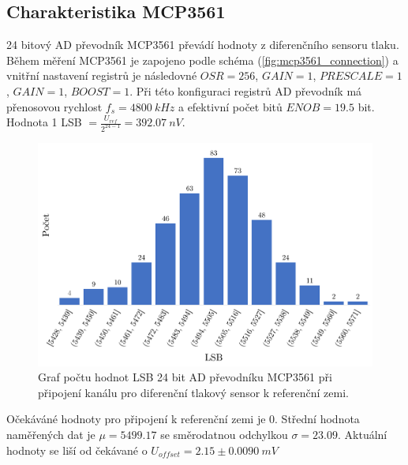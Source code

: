 \subsection{Charakteristika MCP3561} \label{section:char_mcp}
24 bitový AD převodník MCP3561 převádí hodnoty z diferenčního sensoru tlaku. Během měření MCP3561 je zapojeno podle schéma (\ref{fig:mcp3561_connection}) a vnitřní nastavení registrů je následovné $OSR = 256$, $GAIN = 1$, $PRESCALE = 1$, $GAIN = 1$, $BOOST = 1$.
Při této konfiguraci registrů AD převodník má přenosovou rychlost $f_s = 4800 \ kHz$ a efektivní počet bitů $ENOB = 19.5$ bit. Hodnota 1 LSB $= \frac{U_{ref}}{2^{24 - 1}} = 392.07 \ nV$.
\begin{figure}[H]
    \caption{Graf počtu hodnot LSB 24 bit AD převodníku MCP3561 při připojení kanálu
        pro diferenční tlakový sensor k referenční zemi.}
    \includegraphics[width=1\textwidth]{graphs/mcp_gnd.png}
\end{figure}
Očekáváné hodnoty pro připojení k referenční zemi je 0. Střední hodnota naměřených dat je $\mu = 5499.17$ se směrodatnou odchylkou $\sigma = 23.09$. Aktuální hodnoty se liší od čekávané o $U_{offset} = 2.15 \pm 0.0090 \ mV$

